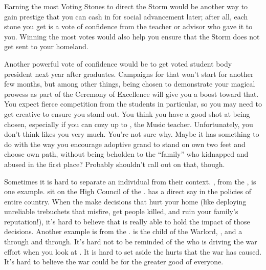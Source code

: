 \documentclass[char]{GL2020}
\begin{document}
Earning the most Voting Stones to direct the Storm would be another way to gain prestige that you can cash in for social advancement later; after all, each stone you get is a vote of confidence from the teacher or advisor who gave it to you. Winning the most votes would also help you ensure that the Storm does not get sent to your homeland.

Another powerful vote of confidence would be to get voted student body president next year after \cPresident{} graduates. Campaigns for that won't start for another few months, but among other things, being chosen to demonstrate your magical prowess as part of the Ceremony of Excellence will give you a boost toward that. You expect fierce competition from the \pTech{} students in particular, so you may need to get creative to ensure you stand out. You think you have a good shot at being chosen, especially if you can cozy up to \cMusic{\full}, the Music teacher. Unfortunately, you don't think \cMusic{} likes you very much. You're not sure why. Maybe it has something to do with the way you encourage \cMusic{\their} adoptive grand\cAdopted{\nibling} \cAdopted{} to stand on \cAdopted{\their} own two feet and choose \cAdopted{\their} own path, without being beholden to the ``family'' who kidnapped and abused \cAdopted{\them} in the first place? Probably shouldn’t call \cMusic{\them} out on that, though.

Sometimes it is hard to separate an individual from their context. \cTechStar{\full}, from the \pTech{}, is one example. \cTechStar{\They} sit\cTechStar{\verbs} on the High Council of the \pTech{}. \cTechStar{} has a direct say in the policies of \cTechStar{\their} entire country. When the \pTech{} make decisions that hurt your home (like deploying unreliable trebuchets that misfire, get people killed, and ruin your family's reputation!), it's hard to believe that \cTechStar{} is really able to hold the impact of those decisions. Another example is \cWarlordDaughter{\full} from the \pShip{}. \cWarlordDaughter{} is the child of the \pShippie{} Warlord, \cLoud{\full}, and a \pShippie{} through and through. It's hard not to be reminded of the \cLoud{\person} who is driving the war effort when you look at \cWarlordDaughter{\them}. It is hard to set aside the hurts that the war has caused. It's hard to believe the war could be for the greater good of everyone. 
\end{document}
